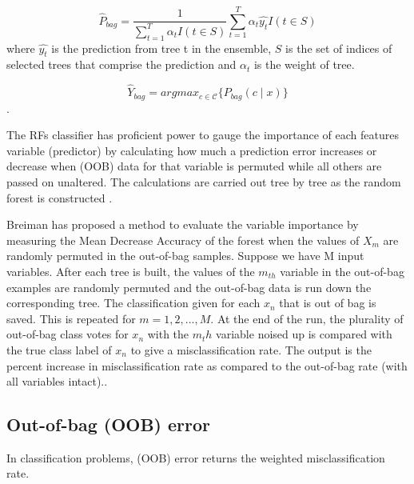 \begin{equation}\label{eq:maximum_posteriori}
\hat{P}_{bag}= \frac{1}{\sum_{t=1}^{T} \alpha_t I(t\in S)} \sum_{t=1}^{T} \alpha_t \hat{y_t} I(t\in S)
\end{equation}
where $\hat{y_t}$ is the prediction from tree t in the ensemble, $S$ is the set of indices of selected trees that comprise the prediction and $\alpha_t$ is the weight of tree.


\begin{equation}\label{eq:maximum_posteriori}
\hat{Y}_{bag}= argmax_{c \in \mathcal{C}} \{ P_{bag}(c \mid x)\}
\end{equation}.



 


The RFs classifier has proficient power to gauge the importance of each features variable (predictor) \citep{breiman2001random} by calculating how much a prediction error increases or decrease  when (OOB) data for that variable is permuted while all others are passed on unaltered. The calculations are carried out tree by tree as the random forest is constructed \citep{breiman2001random,breiman2002manual,liaw2002classification}.


Breiman has proposed a method to evaluate the variable importance by measuring the Mean Decrease Accuracy of the forest when the values of $X_m$ are randomly permuted in the out-of-bag samples. Suppose we have M input variables. After each tree is built, the values of the $m_{th}$ variable in the out-of-bag examples are randomly permuted and the out-of-bag data is run down the corresponding tree. The classification given for each $x_n$ that is out of bag is saved. This is repeated for $m=1,2, ... , M$. At the end of the run, the plurality of out-of-bag class votes for $x_n$ with the $m_th$ variable noised up is compared with the true class label of $x_n$ to give a misclassification rate. The output is the percent increase in misclassification rate as compared to the out-of-bag rate (with all variables intact).\citep{breiman2001random,louppe2013understanding}.


\subsection{Out-of-bag (OOB) error }
In classification problems, (OOB) error returns the weighted misclassification rate.

